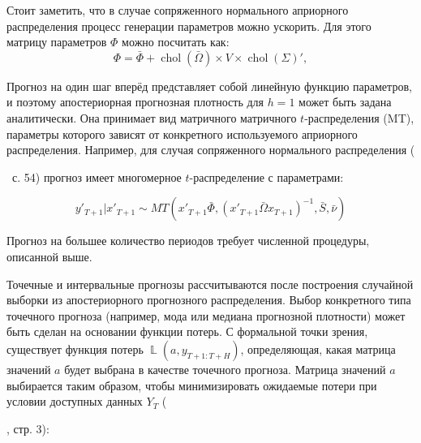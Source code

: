 \documentclass[11pt]{article} %
\DeclareMathOperator{\Loss}{\mathbb{L}}
\DeclareMathOperator{\chol}{chol}
\newcommand{\eng}[1]{\begin{otherlanguage}{english}#1\end{otherlanguage}}
\begin{document}
Стоит заметить, что в случае сопряженного нормального априорного распределения процесс генерации параметров можно ускорить. Для этого матрицу параметров $\Phi$ можно посчитать как:
\begin{equation}
\Phi=\bar \Phi+\chol (\bar \Omega)\times V\times \chol(\Sigma)',
\end{equation}

Прогноз на один шаг вперёд представляет собой линейную функцию параметров, и поэтому апостериорная прогнозная плотность для $h=1$ может быть задана аналитически. Она принимает вид матричного матричного $t$-распределения (MT), параметры которого зависят от конкретного используемого априорного распределения.  Например, для случая сопряженного нормального распределения (\eng{\cite{carriero_al_2015}}~с. 54) прогноз имеет многомерное $t$-распределение с параметрами:

\begin{equation}
y'_{T+1}|x'_{T+1}\sim MT \left(x'_{T+1}\bar\Phi, \left(x'_{T+1}\bar\Omega x_{T+1}\right)^{-1},\bar S,\bar\nu\right)
\end{equation}


Прогноз на большее количество периодов требует численной процедуры, описанной выше.

Точечные и интервальные прогнозы рассчитываются после построения случайной выборки из апостериорного прогнозного распределения. Выбор конкретного типа точечного прогноза  (например, мода или медиана прогнозной плотности) может быть сделан на основании функции потерь. С формальной точки зрения, существует функция потерь $\Loss(a, y_{T+1:T+H})$, определяющая, какая матрица значений $a$ будет выбрана в качестве точечного прогноза. Матрица значений $a$ выбирается таким образом, чтобы минимизировать ожидаемые потери при условии доступных данных $Y_T$ (\eng{\cite{karlsson_2012}}, стр. 3):
\end{document}
